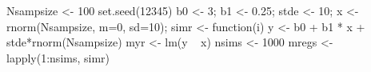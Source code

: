 \begin{Schunk}
\begin{Sinput}
 Nsampsize <- 100
 set.seed(12345)
 b0 <- 3; b1 <- 0.25; stde <- 10;
 x <- rnorm(Nsampsize, m=0, sd=10);
 simr <- function(i){
  y <- b0 + b1 * x + stde*rnorm(Nsampsize)
  myr <- lm(y ~ x)
  }
 nsims <- 1000
 mregs <- lapply(1:nsims, simr)
\end{Sinput}
\end{Schunk}

